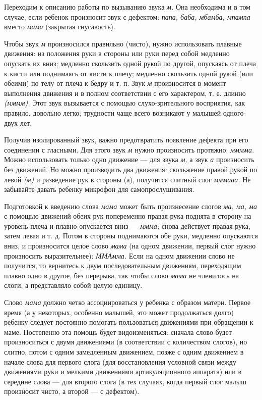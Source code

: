 \documentclass[a5paper]{book}
\renewcommand{\emph}[1]{\textit{#1}}
\begin{document}
Переходим к описанию работы по вызыванию звука \emph{м.} Она необходима
и в том случае, если ребенок произносит звук с дефектом: \emph{папа,
баба, мбамба, мпампа} вместо \emph{мама} (закрытая гнусавость).

Чтобы звук \emph{м} произносился правильно (чисто), нужно использовать
плавные движения: из положения руки в стороны или руки перед собой
медленно опускать их вниз; медленно скользить одной рукой по другой,
опускаясь от плеча к кисти или поднимаясь от кисти к плечу; медленно
скользить одной рукой (или обеими) по телу от плеча к бедру и т. п. Звук
\emph{м} произносится в момент выполнения движения и в полном
соответствии с его характером, т. е. длинно \emph{(мммм).} Этот звук
вызывается с помощью слухо-зрительного восприятия, как правило, довольно
легко; трудности чаще всего возникают у малышей одного-двух лет.

Получив изолированный звук, важно предотвратить появление дефекта при
его соединении с гласными. Для этого звук \emph{м} нужно произносить
протяжно: \emph{мммма.} Можно использовать только одно движение --- для
звука \emph{м,} а звук \emph{а} произносить без движений. Но можно
производить два движения: скольжение правой рукой по левой \emph{(м)} и
разведение рук в стороны (а), получится слитный слог \emph{мммааа.} Не
забывайте давать ребенку микрофон для самопрослушивания.

Подготовкой к введению слова \emph{мама} может быть произнесение слогов
\emph{ма, ма, ма} с помощью движений обеих рук попеременно правая рука
поднята в сторону на уровень плеча и плавно опускается вниз ---
\emph{ммма;} снова действует правая рука, затем левая и т. д. Потом в
стороны поднимаются обе руки, медленно опускаются вниз, и произносится
целое слово \emph{мама} (на одном движении, первый слог нужно
произносить выразительнее): \emph{ММАмма.} Если на одном движении слово
не получится, то вернитесь к двум последовательным движениям,
переходящим плавно одно в другое, без перерыва, так чтобы слово
\emph{мама} не членилось на слоги, а представляло собой целую единицу.

Слово \emph{мама} должно четко ассоциироваться у ребенка с образом
матери. Первое время (а у некоторых, особенно малышей, это может
продолжаться долго) ребенку следует постоянно помогать пользоваться
движениями при обращении к маме. Постепенно эта помощь будет
видоизменяться: сначала слово будет произноситься с двумя движениями (в
соответствии с количеством слогов), но слитно, потом с одним замедленным
движением, позже с одним движением в начале слова для первого слога (для
восстановления условной связи между движениями руки и мелкими движениями
артикуляционного аппарата) или в середине слова --- для второго слога (в
тех случаях, когда первый слог малыш произносит чисто, а второй --- с
дефектом).
\end{document}
